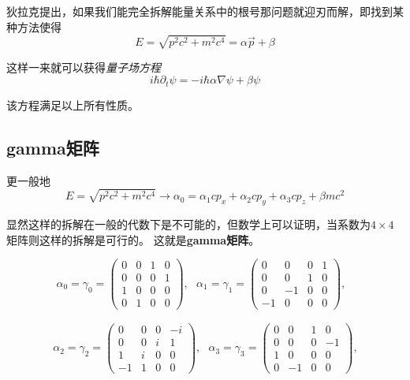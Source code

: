 狄拉克提出，如果我们能完全拆解能量关系中的根号那问题就迎刃而解，即找到某种方法使得
\begin{equation}
    E=\sqrt{p^2c^2+m^2c^4}=\alpha\vec{p}+\beta     
\end{equation}

这样一来就可以获得\textsl{量子场方程}
\begin{equation}
    i\hbar\partial_t \psi = -i\hbar \alpha\nabla\psi+\beta\psi
\end{equation}

该方程满足以上所有性质。

\subsection*{gamma矩阵}

更一般地
\begin{equation}
    E=\sqrt{p^2c^2+m^2c^4}\rightarrow \alpha_0=\alpha_1cp_x+\alpha_2cp_y+\alpha_3cp_z+\beta mc^2
\end{equation}

显然这样的拆解在一般的代数下是不可能的，但数学上可以证明，当系数为$4\times 4$矩阵则这样的拆解是可行的。
这就是\textbf{gamma矩阵}。

\begin{equation}
    \alpha_0=\gamma_0=
    \left(\begin{array}{cccc}
        0 & 0 & 1 & 0\\
        0 & 0 & 0 & 1\\
        1 & 0 & 0 & 0\\
        0 & 1 & 0 & 0
    \end{array}\right),\ \ \ 
    \alpha_1=\gamma_1=
    \left(\begin{array}{cccc}
        0 & 0 & 0 & 1\\
        0 & 0 & 1 & 0\\
        0 & -1& 0 & 0\\
        -1& 0 & 0 & 0
    \end{array}\right),\ \ \ 
\end{equation}

\begin{eqnarray}
    &\alpha_2=\gamma_2=
    \left(\begin{array}{cccc}
        0 & 0 & 0 &-i\\
        0 & 0 & i & 1\\
        1 & i & 0 & 0\\
        -1& 1 & 0 & 0
    \end{array}\right),\ \ \ 
    \alpha_3=\gamma_3=
    \left(\begin{array}{cccc}
        0 & 0 & 1 & 0\\
        0 & 0 & 0 &-1\\
        1 & 0 & 0 & 0\\
        0 &-1 & 0 & 0
    \end{array}\right),\ \ \
\end{eqnarray}

